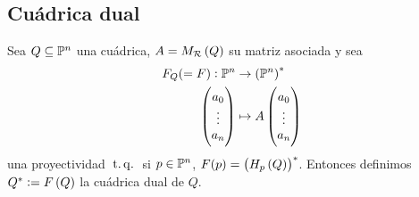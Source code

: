\subsection{Cuádrica dual}
\begin{defi}
  Sea $Q\subseteq \mathbb{P}^n$ una cuádrica, $A=M_{\mathcal{R}}\left( Q\right)$ su matriz asociada y sea
  \begin{align*}
    F_Q (=F):\mathbb{P}^n & \to \left(\mathbb{P}^n \right) ^*\\
    \begin{pmatrix}
      a_0\\
      \vdots\\
      a_n\\
    \end{pmatrix} &\mapsto A
    \begin{pmatrix}
      a_0\\
      \vdots\\
      a_n\\
    \end{pmatrix}
  \end{align*}
  una proyectividad $\operatorname{\;t.q.\;}$ si $p\in\mathbb{P}^n$, $F(p)=\left( H_p\left( Q\right)\right)^*$. Entonces definimos 
  $Q^* := F\left( Q\right)$ la cuádrica dual de $Q$.
\end{defi}

